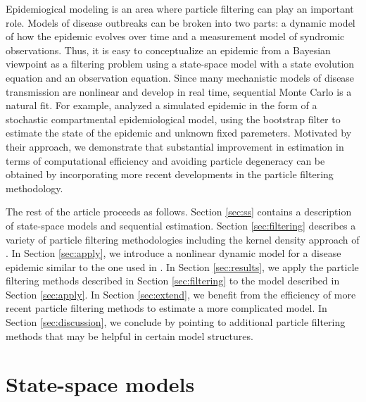 \documentclass{elsarticle}
\begin{document}
Epidemiogical modeling is an area where particle filtering can play an important role. Models of disease outbreaks can be broken into two parts: a dynamic model of how the epidemic evolves over time and a measurement model of syndromic observations. Thus, it is easy to conceptualize an epidemic from a Bayesian viewpoint as a filtering problem using a state-space model with a state evolution equation and an observation equation. Since many mechanistic models of disease transmission are nonlinear and develop in real time, sequential Monte Carlo is a natural fit. For example, \citet{skvortsov2012monitoring} analyzed a simulated epidemic in the form of a stochastic compartmental epidemiological model, using the bootstrap filter to estimate the state of the epidemic and unknown fixed paremeters. Motivated by their approach, we demonstrate that substantial improvement in estimation in terms of computational efficiency and avoiding particle degeneracy can be obtained by incorporating more recent developments in the particle filtering methodology.

The rest of the article proceeds as follows. Section \ref{sec:ss} contains a description of state-space models and sequential estimation. Section \ref{sec:filtering} describes a variety of particle filtering methodologies including the kernel density approach of \cite{Liu:West:comb:2001}. In Section \ref{sec:apply}, we introduce a nonlinear dynamic model for a disease epidemic similar to the one used in \citet{skvortsov2012monitoring}. In Section \ref{sec:results}, we apply the particle filtering methods described in Section \ref{sec:filtering} to the model described in Section \ref{sec:apply}. In Section \ref{sec:extend}, we benefit from the efficiency of more recent particle filtering methods to estimate a more complicated model. In Section \ref{sec:discussion}, we conclude by pointing to additional particle filtering methods that may be helpful in certain model structures.

\section{State-space models \label{sec:ss}}
\end{document}
